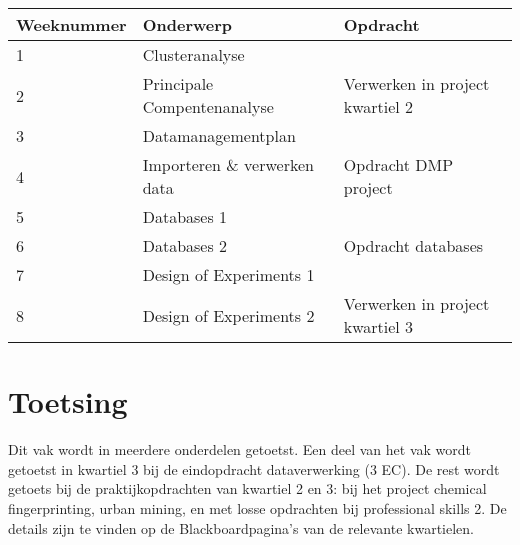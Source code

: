 \begin{table}[h]
\begin{tabular}{|l|l|l|}
\hline
\rowcolor[HTML]{009C82} 
Weeknummer & Onderwerp                    & Opdracht                         \\ \hline
1          & Clusteranalyse               &                                  \\ \hline
2          & Principale Compentenanalyse  & Verwerken in project kwartiel 2 \\ \hline
\rowcolor[HTML]{C0C0C0} 
3          & Datamanagementplan           &                                  \\ \hline
\rowcolor[HTML]{C0C0C0} 
4          & Importeren \& verwerken data & Opdracht DMP project             \\ \hline
5          & Databases 1                  &                                  \\ \hline
6          & Databases 2                  & Opdracht databases               \\ \hline
\rowcolor[HTML]{C0C0C0} 
7          & Design of Experiments 1      &                                  \\ \hline
\rowcolor[HTML]{C0C0C0} 
8          & Design of Experiments 2      & Verwerken in project kwartiel 3 \\ \hline
\end{tabular}
\end{table}


\section{Toetsing}

Dit vak wordt in meerdere onderdelen getoetst. Een deel van het vak wordt getoetst in kwartiel 3 bij de eindopdracht dataverwerking (3 EC). De rest wordt getoets bij de praktijkopdrachten van kwartiel 2 en 3: bij het project chemical fingerprinting, urban mining, en met losse opdrachten bij professional skills 2. De details zijn te vinden op de Blackboardpagina's van de relevante kwartielen. 